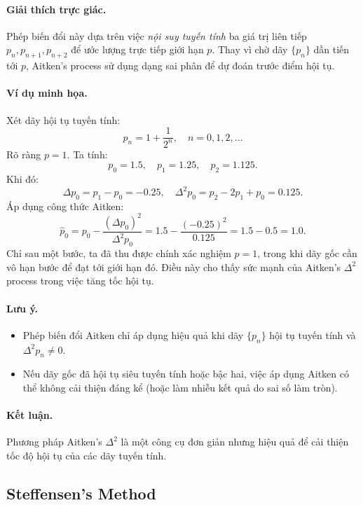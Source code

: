\paragraph*{Giải thích trực giác.}
Phép biến đổi này dựa trên việc \emph{nội suy tuyến tính} 
ba giá trị liên tiếp $p_n, p_{n+1}, p_{n+2}$ 
để ước lượng trực tiếp giới hạn $p$.  
Thay vì chờ dãy $\{p_n\}$ dần tiến tới $p$, 
Aitken’s process sử dụng dạng sai phân để dự đoán trước điểm hội tụ.

\paragraph*{Ví dụ minh họa.}
Xét dãy hội tụ tuyến tính:
\[
    p_n = 1 + \frac{1}{2^n}, \quad n = 0,1,2,\dots
\]
Rõ ràng $p = 1$.  
Ta tính:
\[
    p_0 = 1.5, \quad p_1 = 1.25, \quad p_2 = 1.125.
\]
Khi đó:
\[
    \Delta p_0 = p_1 - p_0 = -0.25, \quad
    \Delta^2 p_0 = p_2 - 2p_1 + p_0 = 0.125.
\]
Áp dụng công thức Aitken:
\[
    \hat{p}_0 = p_0 - \frac{(\Delta p_0)^2}{\Delta^2 p_0}
               = 1.5 - \frac{(-0.25)^2}{0.125} = 1.5 - 0.5 = 1.0.
\]
Chỉ sau một bước, ta đã thu được chính xác nghiệm $p = 1$, 
trong khi dãy gốc cần vô hạn bước để đạt tới giới hạn đó.  
Điều này cho thấy sức mạnh của Aitken’s $\Delta^2$ process 
trong việc tăng tốc hội tụ.

\paragraph*{Lưu ý.}
\begin{itemize}
    \item Phép biến đổi Aitken chỉ áp dụng hiệu quả khi dãy $\{p_n\}$ 
    hội tụ tuyến tính và $\Delta^2 p_n \ne 0$.
    \item Nếu dãy gốc đã hội tụ siêu tuyến tính hoặc bậc hai, 
    việc áp dụng Aitken có thể không cải thiện đáng kể (hoặc làm nhiễu kết quả do sai số làm tròn).
\end{itemize}

\paragraph*{Kết luận.}
Phương pháp Aitken’s $\Delta^2$ là một công cụ đơn giản nhưng hiệu quả 
để cải thiện tốc độ hội tụ của các dãy tuyến tính.  

\subsection{Steffensen’s Method}

